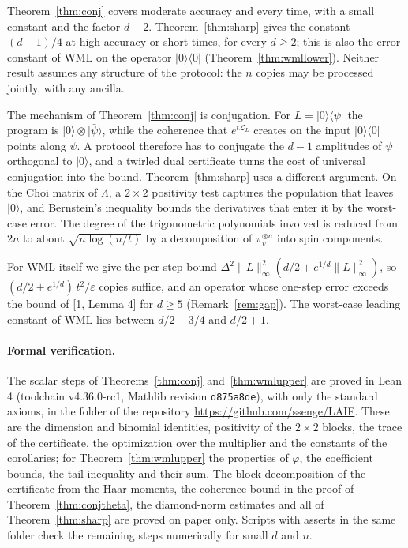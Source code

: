 \documentclass[11pt]{article}
\theoremstyle{remark}
\newcommand{\Lind}{\mathcal{L}}
\newcommand{\ket}[1]{\lvert #1 \rangle}
\newcommand{\bra}[1]{\langle #1 \rvert}
\newcommand{\proj}[1]{\lvert #1 \rangle\langle #1 \rvert}
\begin{document}
Theorem~\ref{thm:conj} covers moderate accuracy and every time, with a small constant and the factor $d-2$. Theorem~\ref{thm:sharp} gives the constant $(d-1)/4$ at high accuracy or short times, for every $d \ge 2$; this is also the error constant of WML on the operator $\proj{0}$ (Theorem~\ref{thm:wmllower}). Neither result assumes any structure of the protocol: the $n$ copies may be processed jointly, with any ancilla.

The mechanism of Theorem~\ref{thm:conj} is conjugation. For $L = \ket{0}\bra{\psi}$ the program is $\ket{0} \otimes \ket{\bar\psi}$, while the coherence that $e^{t\Lind_L}$ creates on the input $\proj{0}$ points along $\psi$. A protocol therefore has to conjugate the $d-1$ amplitudes of $\psi$ orthogonal to $\ket{0}$, and a twirled dual certificate turns the cost of universal conjugation into the bound. Theorem~\ref{thm:sharp} uses a different argument. On the Choi matrix of $\Lambda$, a $2\times 2$ positivity test captures the population that leaves $\ket{0}$, and Bernstein's inequality bounds the derivatives that enter it by the worst-case error. The degree of the trigonometric polynomials involved is reduced from $2n$ to about $\sqrt{n\log(n/t)}$ by a decomposition of $\pi_v^{\otimes n}$ into spin components.

For WML itself we give the per-step bound $\Delta^2\lVert L\rVert_\infty^2 (d/2 + e^{1/d}\lVert L\rVert_\infty^2)$, so $(d/2 + e^{1/d})\,t^2/\varepsilon$ copies suffice, and an operator whose one-step error exceeds the bound of [1, Lemma 4] for $d \ge 5$ (Remark~\ref{rem:gap}). The worst-case leading constant of WML lies between $d/2 - 3/4$ and $d/2 + 1$.

\paragraph{Formal verification.} The scalar steps of Theorems~\ref{thm:conj} and~\ref{thm:wmlupper} are proved in Lean 4 (toolchain v4.36.0-rc1, Mathlib revision \texttt{d875a8de}), with only the standard axioms, in the folder  of the repository \url{https://github.com/ssenge/LAIF}. These are the dimension and binomial identities, positivity of the $2\times 2$ blocks, the trace of the certificate, the optimization over the multiplier and the constants of the corollaries; for Theorem~\ref{thm:wmlupper} the properties of $\varphi$, the coefficient bounds, the tail inequality and their sum. The block decomposition of the certificate from the Haar moments, the coherence bound in the proof of Theorem~\ref{thm:conjtheta}, the diamond-norm estimates and all of Theorem~\ref{thm:sharp} are proved on paper only. Scripts with asserts in the same folder check the remaining steps numerically for small $d$ and $n$.
\end{document}

